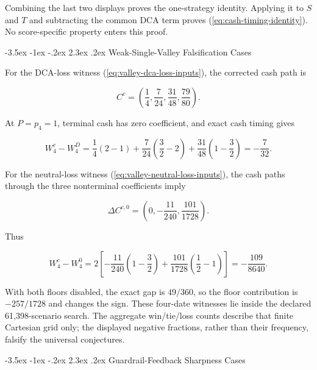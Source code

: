 \documentclass[12pt,a4paper,oneside]{report}
\makeatletter
\renewcommand\section{\@startsection{section}{1}{\z@}%
  {-3.5ex \@plus -1ex \@minus -.2ex}%
  {2.3ex \@plus .2ex}%
  {\normalfont\fontsize{14}{17}\selectfont\bfseries}}
\makeatother
\begin{document}
Combining the last two displays proves the one-strategy identity. Applying it
to $S$ and $T$ and subtracting the common DCA term proves
(\ref{eq:cash-timing-identity}). No score-specific property enters this proof.

\section{Weak-Single-Valley Falsification Cases}
\label{sec:appendix-valley-falsification}

For the DCA-loss witness (\ref{eq:valley-dca-loss-inputs}), the corrected cash
path is

\begin{equation}
  C^c=\left(\frac14,\frac7{24},\frac{31}{48},\frac{79}{80}\right).
  \label{eq:appendix-valley-dca-cash}
\end{equation}

At $P=p_4=1$, terminal cash has zero coefficient, and exact cash timing gives

\begin{equation}
  W_4^c-W_4^D
  =\frac14(2-1)
   +\frac7{24}\left(\frac32-2\right)
   +\frac{31}{48}\left(1-\frac32\right)
  =-\frac7{32}.
  \label{eq:appendix-valley-dca-loss}
\end{equation}

For the neutral-loss witness (\ref{eq:valley-neutral-loss-inputs}), the cash
paths through the three nonterminal coefficients imply

\begin{equation}
  \Delta C^{c,0}=\left(0,-\frac{11}{240},\frac{101}{1728}\right).
  \label{eq:appendix-valley-neutral-cash}
\end{equation}

Thus

\begin{equation}
  W_4^c-W_4^0
  =2\left[-\frac{11}{240}\left(1-\frac32\right)
          +\frac{101}{1728}\left(\frac12-1\right)\right]
  =-\frac{109}{8640}.
  \label{eq:appendix-valley-neutral-loss}
\end{equation}

With both floors disabled, the exact gap is $49/360$, so the floor
contribution is $-257/1728$ and changes the sign. These four-date witnesses
lie inside the declared 61,398-scenario search. The aggregate win/tie/loss
counts describe that finite Cartesian grid only; the displayed negative
fractions, rather than their frequency, falsify the universal conjectures.

\section{Guardrail-Feedback Sharpness Cases}
\label{sec:appendix-guardrail-feedback}
\end{document}
